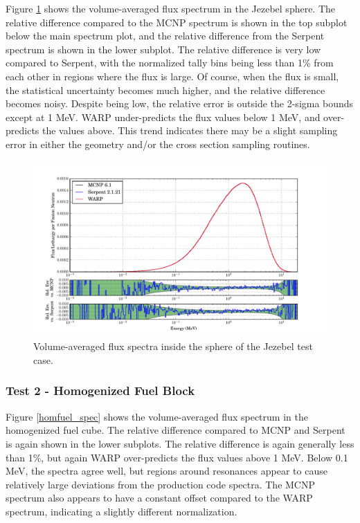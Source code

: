 \documentclass[preprint,12pt]{elsarticle}
\begin{document}
Figure \ref{jezebel_spec} shows the volume-averaged flux spectrum in the Jezebel sphere.  The relative difference compared to the MCNP spectrum is shown in the top subplot below the main spectrum plot, and the relative difference from the Serpent spectrum is shown in the lower subplot.  The relative difference is very low compared to Serpent, with the normalized tally bins being less than 1\% from each other in regions where the flux is large.  Of course, when the flux is small, the statistical uncertainty becomes much higher, and the relative difference becomes noisy.   Despite being low, the relative error is outside the 2-sigma bounds except at 1 MeV.  WARP under-predicts the flux values below 1 MeV, and over-predicts the values above.  This trend indicates there may be a slight sampling error in either the geometry and/or the cross section sampling routines. 

\begin{figure}[h!]
\centering
\includegraphics[width=\textwidth,trim= 1cm 0cm 1cm 0cm]{graphics/jezebel_spec.pdf}
\caption{Volume-averaged flux spectra inside the sphere of the Jezebel test case. \label{jezebel_spec} }
\end{figure}

\newpage
\subsubsection{Test 2 - Homogenized Fuel Block}

Figure \ref{homfuel_spec} shows the volume-averaged flux spectrum in the homogenized fuel cube.  The relative difference compared to MCNP and Serpent is again shown in the lower subplots.  The relative difference is again generally less than 1\%, but again WARP over-predicts the flux values above 1 MeV.  Below 0.1 MeV, the spectra agree well, but regions around resonances appear to cause relatively large deviations from the production code spectra.  The MCNP spectrum also appears to have a constant offset compared to the WARP spectrum, indicating a slightly different normalization. 
\end{document}

